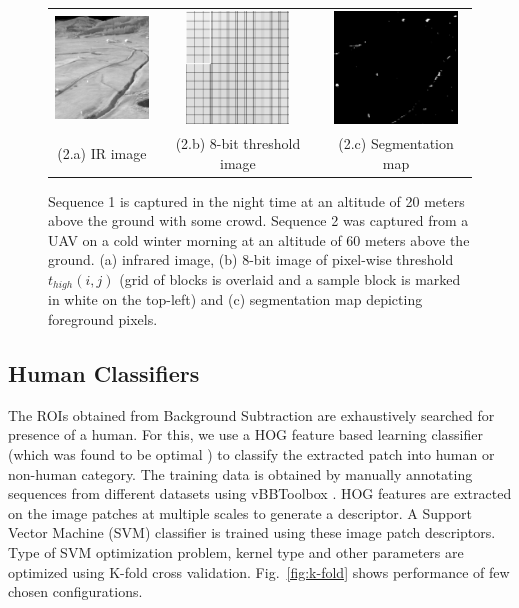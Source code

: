 \documentclass[runningheads]{llncs}
\begin{document}
\begin{figure}[!ht]
  \begin{tabular}{ccc}
    \includegraphics[height=3cm]{img/eps/bg_sub/Roth_Infrared_Image_screenshot.eps} &
    \includegraphics[height=3cm]{img/eps/bg_sub/Roth_Threshold_values_high_screenshot.eps} &
    \includegraphics[height=3cm]{img/eps/bg_sub/Roth_Segmentation_Map_screenshot.eps} \\
    \small (2.a) IR image & 
    \small (2.b) 8-bit threshold image &
    \small (2.c) Segmentation map
  \end{tabular}

  \caption{Sequence 1 is captured in the night time at an altitude of 20 meters above the ground with some crowd. Sequence 2 was captured from a UAV on a cold winter morning at an altitude of 60 meters above the ground. (a) infrared image, (b) 8-bit image of pixel-wise threshold $t_{high}(i, j)$  (grid of blocks is overlaid and a sample block is marked in white on the top-left) and (c) segmentation map depicting foreground pixels.}\label{fig:bg_sub}
\end{figure}


\subsection{Human Classifiers}

The ROIs obtained from Background Subtraction are exhaustively searched for presence of a human. For this, we use a HOG feature based learning classifier (which was found to be optimal \cite{portmann2014people}) to classify the extracted patch into human or non-human category. The training data is obtained by manually annotating sequences from different datasets using vBBToolbox \cite{PMT}. HOG features are extracted on the image patches at multiple scales to generate a descriptor. A Support Vector Machine (SVM) classifier is trained using these image patch descriptors. Type of SVM optimization problem, kernel type and other parameters are optimized using K-fold cross validation. Fig.~\ref{fig:k-fold} shows performance of few chosen configurations.
\end{document}
